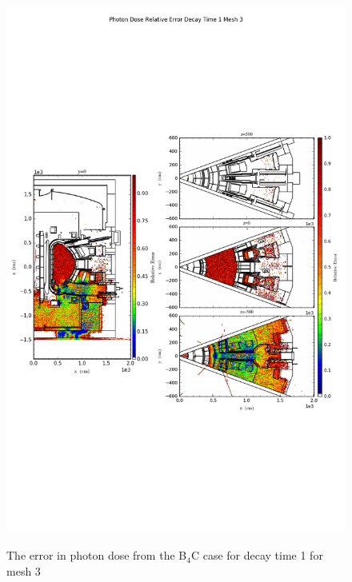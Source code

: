 \begin{figure}[ht!]
\centering
\includegraphics[trim={0cm 9cm 0cm 10cm},clip,scale=0.75]{../plots/final_model_nob4c/Photon_Dose_Relative_Error_Decay_Time_1_Mesh_3.png}
\label{fig:photons_dc1_no4bc_m3_error}
\caption{The error in photon dose from the B$_4$C case for decay time 1 for mesh 3}
\end{figure}

